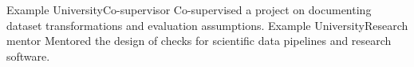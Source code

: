   {Example University}{Co-supervisor}{
  Co-supervised a project on documenting dataset transformations and evaluation assumptions.
}
  {Example University}{Research mentor}{
  Mentored the design of checks for scientific data pipelines and research software.
}
